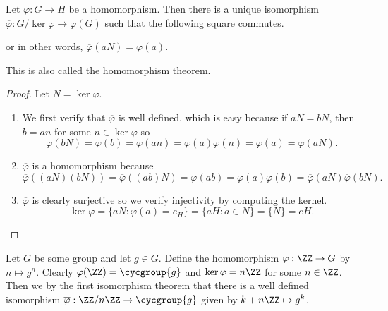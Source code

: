 \begin{thm}
Let $\varphi : G \to H$ be a homomorphism. Then there is a unique
isomorphism $\overline{\varphi} : G / \ker\varphi \to \varphi(G)$ such
that the following square commutes.
\begin{center}
\end{center}
or in other words, $\overline{\varphi}(aN) = \varphi(a)$.

This is also called the homomorphism theorem.
\end{thm}

\begin{proof}
Let $N = \ker\varphi$.
\begin{enumerate}
\item We first verify that $\overline\varphi$ is well defined, which is
easy because if $aN = bN$, then $b = an$ for some $n \in \ker\varphi$ so
\[ \overline\varphi(bN) = \varphi(b) = \varphi(an) =
 \varphi(a)\varphi(n) = \varphi(a) = \overline\varphi(aN). \]
\item $\overline\varphi$ is a homomorphism because
\[ \overline\varphi((aN)(bN)) = \overline\varphi((ab)N) = \varphi(ab) =
\varphi(a)\varphi(b) = \overline\varphi(aN) \overline\varphi(bN). \]
\item $\overline\varphi$ is clearly surjective so we verify injectivity
by computing the kernel.
\[ \ker\overline\varphi = \lbrace aN : \varphi(a) = e_H \rbrace =
\lbrace aH : a \in N \rbrace = \lbrace N \rbrace = eH. \]
\end{enumerate}
\end{proof}

\begin{ex}
Let $G$ be some group and let $g \in G$. Define the homomorphism
$\varphi : \ZZ \to G$ by $n \mapsto g^n$. Clearly $\varphi(\ZZ) =
\cycgroup{g}$ and $\ker\varphi = n\ZZ$ for some $n \in \ZZ$. Then we
by the first isomorphism theorem that there is a well defined
isomorphism $\overline\varphi : \ZZ / n\ZZ \to \cycgroup{g}$ given by
$k + n\ZZ \mapsto g^k$.
\end{ex}
